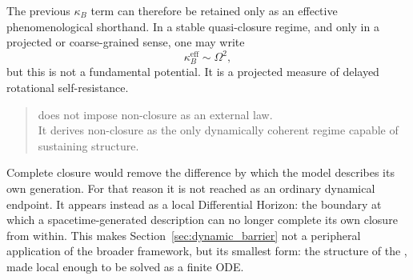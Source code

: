 The previous $\kappa_B$ term can therefore be retained only as an
effective phenomenological shorthand.
In a stable quasi-closure regime,
and only in a projected or coarse-grained sense,
one may write
\begin{equation}
  \kappa_B^{\mathrm{eff}}\sim\Omega^2 ,
\end{equation}
but this is not a fundamental potential.
It is a projected measure of delayed rotational self-resistance.

\medskip
\begin{quote}
\VED{} does not impose non-closure as an external law.\\
It derives non-closure as the only dynamically coherent regime
capable of sustaining structure.
\end{quote}
\medskip

Complete closure would remove the difference by which the model
describes its own generation.
For that reason it is not reached as an ordinary dynamical endpoint.
It appears instead as a local Differential Horizon:
the boundary at which a spacetime-generated description can no longer
complete its own closure from within.
This makes Section~\ref{sec:dynamic_barrier} not a peripheral
application of the broader framework,
but its smallest form:
the structure of the \DHP{},
made local enough to be solved as a finite ODE.
